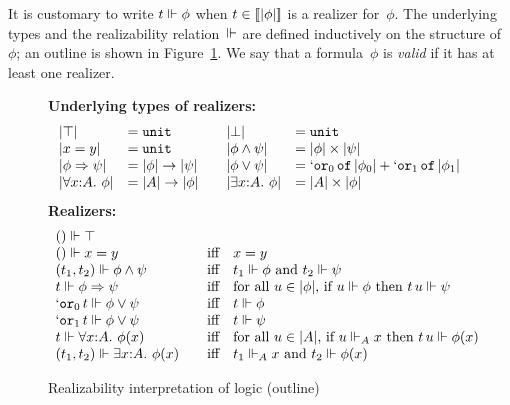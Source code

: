 It is customary to write $t \Vdash \phi$ when $t \in
[\![|\phi|]\!]$ is a realizer for~$\phi$. The underlying types
and the realizability relation~$\Vdash$ are defined inductively on the
structure of~$\phi$; an outline is shown in Figure~\ref{fig:rz-logic}.
We say that a formula~$\phi$ is \emph{valid} if it has at least one
realizer.
%
\begin{figure}[t]
  \textbf{Underlying types of realizers:}
\[
  \begin{array}{ll@{\qquad}ll}
    \typeOf{\itrue} &= \mathtt{unit} &
    \typeOf{\ifalse} &= \mathtt{unit} \\
    \typeOf{\iequal{x}{y}} &= \mathtt{unit} &
    \typeOf{\iand{\phi}{\psi}} &= \oprod{\typeOf{\phi}}{\typeOf{\psi}} \\
    \typeOf{\iimply{\phi}{\psi}} &= \oarrow{\typeOf{\phi}}{\typeOf{\psi}} &
    \typeOf{\ior{\phi}{\psi}} &=
    \osumtyx{\mathtt{or}_0}{\typeOf{\phi_0}}{\mathtt{or}_1}{\typeOf{\phi_1}} \\
    \typeOf{\iforall{x}{A}{\phi}} &= \oarrow{\typeOf{A}}{\typeOf{\phi}} &
    \typeOf{\iexists{x}{A}{\phi}} &= \oprod{\typeOf{A}}{\typeOf{\phi}}
  \end{array}
\]
  \textbf{Realizers:}
\[
  \begin{array}{ll}
    () \Vdash \top & \\
    () \Vdash x = y
    &\quad\text{iff}\quad 
    x = y
    \\
    (t_1,t_2) \Vdash \phi\land \psi
    &\quad\text{iff}\quad
    \text{$t_1 \Vdash \phi$ and $t_2 \Vdash \psi$}
    \\
    t \Vdash \phi\Rightarrow \psi
    &\quad\text{iff}\quad
    \text{for all $u \in |\phi|$, if $u \Vdash \phi$ then $t\,u
      \Vdash \psi$}
    \\
    `\mathtt{or}_0\,t \Vdash \phi\lor \psi
    &\quad\text{iff}\quad
    \text{$t \Vdash \phi$}
    \\
    `\mathtt{or}_1\,t \Vdash \phi\lor \psi
    &\quad\text{iff}\quad
    \text{$t \Vdash \psi$}
    \\
    t \Vdash \forall x{:}A.\ \phi(x)
    &\quad\text{iff}\quad
    \text{for all $u \in |A|$, if $u \Vdash_A x$ then $t\,u \Vdash \phi(x)$}
    \\
    (t_1, t_2) \Vdash \exists x{:}A.\ \phi(x)
    &\quad\text{iff}\quad
    \text{$t_1 \Vdash_A x$ and $t_2 \Vdash \phi(x)$}
  \end{array}
\]
\vspace{-0.5cm}
  \caption{Realizability interpretation of logic (outline)}
  \label{fig:rz-logic}
\end{figure}

